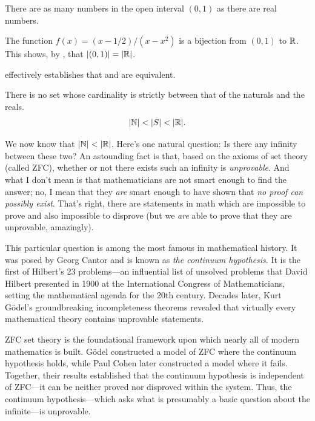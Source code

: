 \documentclass[11pt,twoside=off,numbers=noenddot]{scrbook}
\begin{document}
\begin{theorem}[$\size{(0, 1)} = \size{\RR}$]
    There are as many numbers in the open interval $(0, 1)$ as there are real numbers.
\end{theorem}

\begin{proofidea}
    The function $f(x) = (x-1/2)/(x-x^2)$ is a bijection from $(0, 1)$ to $\mathbb R$. This shows, by , that $\size{(0, 1)} = \size{\RR}$.
\end{proofidea}

\begin{remark}
     effectively establishes that  and  are equivalent.
\end{remark}

\begin{hypothesis}
    There is no set whose cardinality is strictly between that of the naturals and the reals.
    \begin{align*}
        | \mathbb N | < | S | < | \mathbb R |.
    \end{align*}
\end{hypothesis}

\begin{remark}
    We now know that $| \mathbb N | < | \mathbb R |$. Here's one natural question: Is there any infinity between these two? An astounding fact is that, based on the axioms of set theory (called ZFC), whether or not there exists such an infinity is \textit{unprovable}. And what I don't mean is that mathematicians are not smart enough to find the answer; no, I mean that they \textit{are} smart enough to have shown that \textit{no proof can possibly exist}. That's right, there are statements in math which are impossible to prove and also impossible to disprove (but we \textit{are} able to prove that they are unprovable, amazingly).

    This particular question is among the most famous in mathematical history. It was posed by Georg Cantor and is known as \textit{the continuum hypothesis}. It is the first of Hilbert's 23 problems—an influential list of unsolved problems that David Hilbert presented in 1900 at the International Congress of Mathematicians, setting the mathematical agenda for the 20th century. Decades later, Kurt Gödel's groundbreaking incompleteness theorems revealed that virtually every mathematical theory contains unprovable statements.

    ZFC set theory is the foundational framework upon which nearly all of modern mathematics is built. Gödel constructed a model of ZFC where the continuum hypothesis holds, while Paul Cohen later constructed a model where it fails. Together, their results established that the continuum hypothesis is independent of ZFC---it can be neither proved nor disproved within the system. Thus, the continuum hypothesis---which asks what is presumably a basic question about the infinite---is unprovable.
\end{remark}
\end{document}
